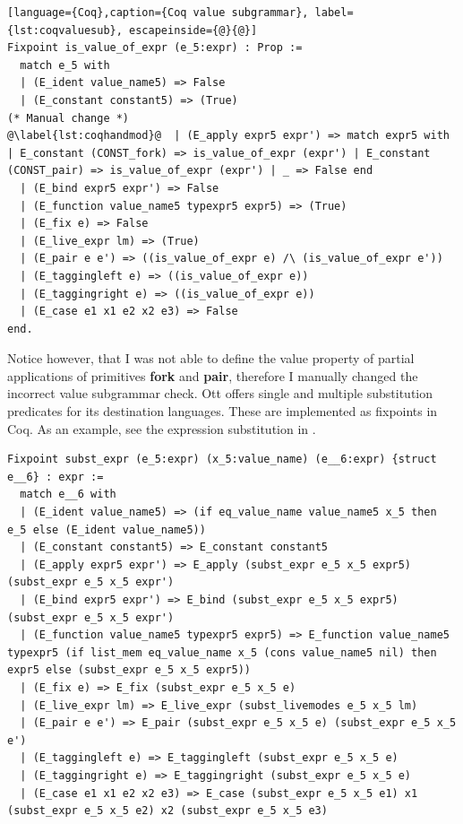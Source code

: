 \documentclass[12pt,twoside,notitlepage]{report}
\begin{document}
\begin{enumerate}
{\begin{minipage}{\linewidth}
\begin{lstlisting}[language={Coq},caption={Coq value subgrammar}, label={lst:coqvaluesub}, escapeinside={@}{@}]
Fixpoint is_value_of_expr (e_5:expr) : Prop :=
  match e_5 with
  | (E_ident value_name5) => False
  | (E_constant constant5) => (True)
(* Manual change *)
@\label{lst:coqhandmod}@  | (E_apply expr5 expr') => match expr5 with | E_constant (CONST_fork) => is_value_of_expr (expr') | E_constant (CONST_pair) => is_value_of_expr (expr') | _ => False end  
  | (E_bind expr5 expr') => False
  | (E_function value_name5 typexpr5 expr5) => (True)
  | (E_fix e) => False
  | (E_live_expr lm) => (True)
  | (E_pair e e') => ((is_value_of_expr e) /\ (is_value_of_expr e'))
  | (E_taggingleft e) => ((is_value_of_expr e))
  | (E_taggingright e) => ((is_value_of_expr e))
  | (E_case e1 x1 e2 x2 e3) => False
end.
\end{lstlisting}
\end{minipage}	
Notice however, that I was not able to define the value property of partial applications of primitives \textbf{fork} and \textbf{pair}, therefore I manually changed the incorrect value subgrammar check. Ott offers single and multiple substitution predicates for its destination languages. These are implemented as fixpoints in Coq. As an example, see the expression substitution in .
\begin{minipage}{\linewidth}
\begin{lstlisting}[language={Coq},caption={Coq expression substitution}, label={lst:coqexprsubst}]
Fixpoint subst_expr (e_5:expr) (x_5:value_name) (e__6:expr) {struct e__6} : expr :=
  match e__6 with
  | (E_ident value_name5) => (if eq_value_name value_name5 x_5 then e_5 else (E_ident value_name5))
  | (E_constant constant5) => E_constant constant5
  | (E_apply expr5 expr') => E_apply (subst_expr e_5 x_5 expr5) (subst_expr e_5 x_5 expr')
  | (E_bind expr5 expr') => E_bind (subst_expr e_5 x_5 expr5) (subst_expr e_5 x_5 expr')
  | (E_function value_name5 typexpr5 expr5) => E_function value_name5 typexpr5 (if list_mem eq_value_name x_5 (cons value_name5 nil) then expr5 else (subst_expr e_5 x_5 expr5))
  | (E_fix e) => E_fix (subst_expr e_5 x_5 e)
  | (E_live_expr lm) => E_live_expr (subst_livemodes e_5 x_5 lm)
  | (E_pair e e') => E_pair (subst_expr e_5 x_5 e) (subst_expr e_5 x_5 e')
  | (E_taggingleft e) => E_taggingleft (subst_expr e_5 x_5 e)
  | (E_taggingright e) => E_taggingright (subst_expr e_5 x_5 e)
  | (E_case e1 x1 e2 x2 e3) => E_case (subst_expr e_5 x_5 e1) x1 (subst_expr e_5 x_5 e2) x2 (subst_expr e_5 x_5 e3)

\end{lstlisting}
\end{minipage}}
\end{enumerate}
\end{document}
